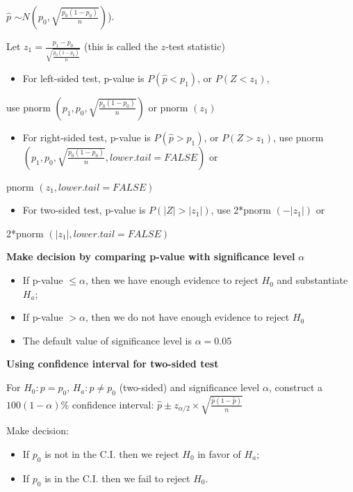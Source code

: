 \documentclass[
]{book}
\providecommand{\tightlist}{%
  \setlength{\itemsep}{0pt}\setlength{\parskip}{0pt}}
\begin{document}
\(\hat{p}\) \(\sim N(p_0, \sqrt{\frac{p_0(1-p_0)}{n}})\)).

Let \(z_1 = \frac{p_1 - p_0}{\sqrt{\frac{p_0(1-p_0)}{n}}}\) (this is called the \(z\)-test statistic)

\begin{itemize}
\tightlist
\item
  For left-sided test, p-value is \(P(\hat{p} < p_1)\), or \(P(Z < z_1)\),
\end{itemize}

use pnorm \(({p_1, p_0,}{\sqrt{\frac{p_0(1-p_0)}{n}}})\) or pnorm \((z_1)\)

\begin{itemize}
\tightlist
\item
  For right-sided test, p-value is \(P(\hat{p} > p_1)\), or \(P(Z > z_1)\), use pnorm\(({p_1,p_0,}{\sqrt{\frac{p_0(1-p_0)}{n}}}, lower.tail = FALSE)\) or
\end{itemize}

pnorm \((z_1, lower.tail = FALSE)\)

\begin{itemize}
\tightlist
\item
  For two-sided test, p-value is \(P(|Z| > |z_1|)\), use 2*pnorm \((-|z_1|)\) or
\end{itemize}

2*pnorm \((|z_1|, lower.tail = FALSE)\)

\textbf{Make decision by comparing p-value with significance level} \(\alpha\)

\begin{itemize}
\item
  If p-value \(\leq \alpha\), then we have enough evidence to reject \(H_0\) and substantiate \(H_a\);
\item
  If p-value \(> \alpha\), then we do not have enough evidence to reject \(H_0\)
\item
  The default value of significance level is \(\alpha = 0.05\)
\end{itemize}

\textbf{Using confidence interval for two-sided test}

For \(H_0: p = p_0\), \(H_a: p \neq p_0\) (two-sided) and significance level \(\alpha\), construct a \(100(1-\alpha)\%\) confidence interval: \(\hat{p} \pm z_{\alpha/2} \times \sqrt{\frac{\hat{p}(1-\hat{p})}{n}}\)

Make decision:

\begin{itemize}
\tightlist
\item
  If \(p_0\) is not in the C.I. then we reject \(H_0\) in favor of \(H_a\);
\item
  If \(p_0\) is in the C.I. then we fail to reject \(H_0\).
\end{itemize}
\end{document}
